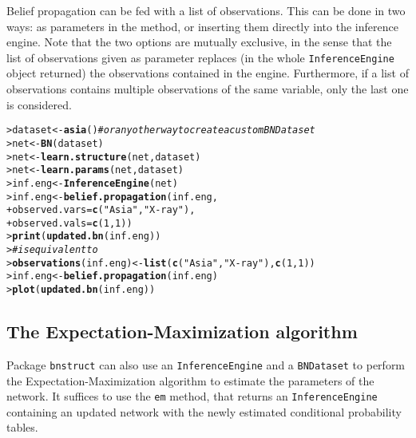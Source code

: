 \documentclass{article}\usepackage[]{graphicx}\usepackage[]{color}
\makeatletter
\newcommand{\hlnum}[1]{\textcolor[rgb]{0.686,0.059,0.569}{#1}}%
\newcommand{\hlstr}[1]{\textcolor[rgb]{0.192,0.494,0.8}{#1}}%
\newcommand{\hlcom}[1]{\textcolor[rgb]{0.678,0.584,0.686}{\textit{#1}}}%
\newcommand{\hlstd}[1]{\textcolor[rgb]{0.345,0.345,0.345}{#1}}%
\newcommand{\hlkwb}[1]{\textcolor[rgb]{0.69,0.353,0.396}{#1}}%
\newcommand{\hlkwc}[1]{\textcolor[rgb]{0.333,0.667,0.333}{#1}}%
\newcommand{\hlkwd}[1]{\textcolor[rgb]{0.737,0.353,0.396}{\textbf{#1}}}%
\newenvironment{kframe}{%
 \def\at@end@of@kframe{}%
 \ifinner\ifhmode%
  \def\at@end@of@kframe{\end{minipage}}%
  \begin{minipage}{\columnwidth}%
 \fi\fi%
 \def\FrameCommand##1{\hskip\@totalleftmargin \hskip-\fboxsep
 \colorbox{shadecolor}{##1}\hskip-\fboxsep
     \hskip-\linewidth \hskip-\@totalleftmargin \hskip\columnwidth}%
 \MakeFramed {\advance\hsize-\width
   \@totalleftmargin\z@ \linewidth\hsize
   \@setminipage}}%
 {\par\unskip\endMakeFramed%
 \at@end@of@kframe}
\newenvironment{knitrout}{}{} %
\newcommand{\Robject}[1]{{\texttt{#1}}}
\newcommand{\Rpackage}[1]{{\texttt{#1}}}
\newcommand{\Rmethod}[1]{{\texttt{#1}}}
\makeatother
\begin{document}
Belief propagation can be fed with a list of observations. This can be done in two ways: as parameters in the method,
or inserting them directly into the inference engine. Note that the two options are mutually exclusive, in the sense that
the list of observations given as parameter replaces (in the whole \Robject{InferenceEngine} object returned)
the observations contained in the engine. Furthermore, if a list of observations contains multiple observations
of the same variable, only the last one is considered.
\begin{knitrout}
\color{fgcolor}\begin{kframe}
\begin{alltt}
\hlstd{> }\hlstd{dataset} \hlkwb{<-} \hlkwd{asia}\hlstd{()} \hlcom{# or any other way to create a custom BNDataset}
\hlstd{> }\hlstd{net}     \hlkwb{<-} \hlkwd{BN}\hlstd{(dataset)}
\hlstd{> }\hlstd{net}     \hlkwb{<-} \hlkwd{learn.structure}\hlstd{(net, dataset)}
\hlstd{> }\hlstd{net}     \hlkwb{<-} \hlkwd{learn.params}\hlstd{(net, dataset)}
\hlstd{> }\hlstd{inf.eng} \hlkwb{<-} \hlkwd{InferenceEngine}\hlstd{(net)}
\hlstd{> }\hlstd{inf.eng} \hlkwb{<-} \hlkwd{belief.propagation}\hlstd{(inf.eng,}
\hlstd{+ }                              \hlkwc{observed.vars} \hlstd{=} \hlkwd{c}\hlstd{(}\hlstr{"Asia"}\hlstd{,}\hlstr{"X-ray"}\hlstd{),}
\hlstd{+ }                              \hlkwc{observed.vals} \hlstd{=} \hlkwd{c}\hlstd{(}\hlnum{1}\hlstd{,}\hlnum{1}\hlstd{))}
\hlstd{> }\hlkwd{print}\hlstd{(}\hlkwd{updated.bn}\hlstd{(inf.eng))}
\hlstd{> }\hlcom{# is equivalent to}
\hlstd{> }\hlkwd{observations}\hlstd{(inf.eng)} \hlkwb{<-} \hlkwd{list}\hlstd{(}\hlkwd{c}\hlstd{(}\hlstr{"Asia"}\hlstd{,}\hlstr{"X-ray"}\hlstd{),} \hlkwd{c}\hlstd{(}\hlnum{1}\hlstd{,}\hlnum{1}\hlstd{))}
\hlstd{> }\hlstd{inf.eng} \hlkwb{<-} \hlkwd{belief.propagation}\hlstd{(inf.eng)}
\hlstd{> }\hlkwd{plot}\hlstd{(}\hlkwd{updated.bn}\hlstd{(inf.eng))}
\end{alltt}
\end{kframe}
\end{knitrout}

\subsection{The Expectation-Maximization algorithm}
Package \Rpackage{bnstruct} can also use an \Robject{InferenceEngine} and a \Robject{BNDataset} to perform
the Expectation-Maximization algorithm to estimate the parameters of the network.
It suffices to use the \Rmethod{em} method, that returns an \Robject{InferenceEngine} containing
an updated network with the newly estimated conditional probability tables.
\end{document}
